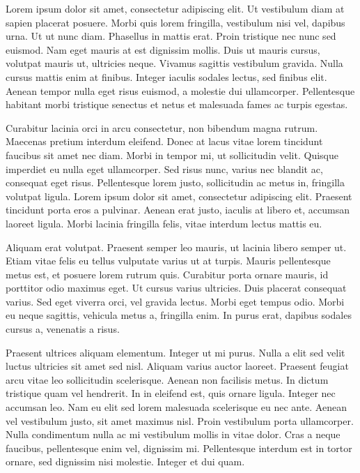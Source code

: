 Lorem ipsum dolor sit amet, consectetur adipiscing elit. Ut vestibulum diam at sapien placerat posuere. Morbi quis lorem fringilla, vestibulum nisi vel, dapibus urna. Ut ut nunc diam. Phasellus in mattis erat. Proin tristique nec nunc sed euismod. Nam eget mauris at est dignissim mollis. Duis ut mauris cursus, volutpat mauris ut, ultricies neque. Vivamus sagittis vestibulum gravida. Nulla cursus mattis enim at finibus. Integer iaculis sodales lectus, sed finibus elit. Aenean tempor nulla eget risus euismod, a molestie dui ullamcorper. Pellentesque habitant morbi tristique senectus et netus et malesuada fames ac turpis egestas.

Curabitur lacinia orci in arcu consectetur, non bibendum magna rutrum. Maecenas pretium interdum eleifend. Donec at lacus vitae lorem tincidunt faucibus sit amet nec diam. Morbi in tempor mi, ut sollicitudin velit. Quisque imperdiet eu nulla eget ullamcorper. Sed risus nunc, varius nec blandit ac, consequat eget risus. Pellentesque lorem justo, sollicitudin ac metus in, fringilla volutpat ligula. Lorem ipsum dolor sit amet, consectetur adipiscing elit. Praesent tincidunt porta eros a pulvinar. Aenean erat justo, iaculis at libero et, accumsan laoreet ligula. Morbi lacinia fringilla felis, vitae interdum lectus mattis eu.

Aliquam erat volutpat. Praesent semper leo mauris, ut lacinia libero semper ut. Etiam vitae felis eu tellus vulputate varius ut at turpis. Mauris pellentesque metus est, et posuere lorem rutrum quis. Curabitur porta ornare mauris, id porttitor odio maximus eget. Ut cursus varius ultricies. Duis placerat consequat varius. Sed eget viverra orci, vel gravida lectus. Morbi eget tempus odio. Morbi eu neque sagittis, vehicula metus a, fringilla enim. In purus erat, dapibus sodales cursus a, venenatis a risus.

Praesent ultrices aliquam elementum. Integer ut mi purus. Nulla a elit sed velit luctus ultricies sit amet sed nisl. Aliquam varius auctor laoreet. Praesent feugiat arcu vitae leo sollicitudin scelerisque. Aenean non facilisis metus. In dictum tristique quam vel hendrerit. In in eleifend est, quis ornare ligula. Integer nec accumsan leo. Nam eu elit sed lorem malesuada scelerisque eu nec ante. Aenean vel vestibulum justo, sit amet maximus nisl. Proin vestibulum porta ullamcorper. Nulla condimentum nulla ac mi vestibulum mollis in vitae dolor. Cras a neque faucibus, pellentesque enim vel, dignissim mi. Pellentesque interdum est in tortor ornare, sed dignissim nisi molestie. Integer et dui quam.

